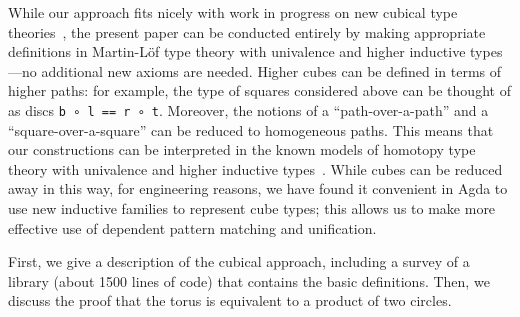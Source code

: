 While our approach fits nicely with work in progress on new cubical type
theories~\citep{us,altenkirchkaposi14cubical,coquand14variations}, the
present paper can be conducted entirely by making appropriate
definitions in Martin-L\"of type theory with univalence and higher
inductive types---no additional new axioms are needed.  Higher cubes can
be defined in terms of higher paths: for example, the type of squares
considered above can be thought of as discs \verb|b ∘ l == r ∘ t|.
Moreover, the notions of a ``path-over-a-path'' and a
``square-over-a-square'' can be reduced to homogeneous paths.  This
means that our constructions can be interpreted in the known models of
homotopy type theory with univalence and higher inductive
types~\cite{voevodsky+12simpluniv,shulman13inversediag,lumsdaine+13hits}.
While cubes can be reduced away in this way, for engineering reasons, we
have found it convenient in Agda to use new inductive families to
represent cube types; this allows us to make more effective use of
dependent pattern matching and unification.

First, we give a description of the cubical approach, including a survey
of a library (about 1500 lines of code) that contains the basic
definitions.  Then, we discuss the proof that the torus is equivalent to
a product of two circles.  


